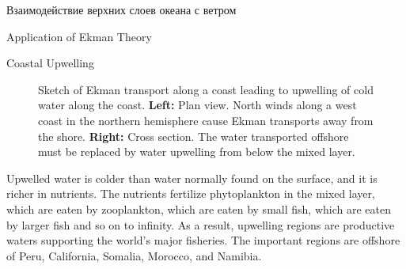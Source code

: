 \begin{chapter}{Взаимодействие верхних слоев океана с ветром}
\begin{section}{Application of Ekman Theory}
\begin{paragraph}{Coastal Upwelling}
\begin{figure}[t!]
\caption{Sketch of Ekman transport along a coast leading to
upwelling of cold water along the
coast. \textbf{Left:} Plan view. North winds along a west coast in the
northern hemisphere cause Ekman transports away from the
shore. \textbf{Right:} Cross section. The water transported offshore
must be replaced by water upwelling from below the mixed
layer.}
\label{fig:upwelling}
\end{figure}
%

Upwelled water is colder than water normally found on the surface, and
it is richer in nutrients. The nutrients fertilize phytoplankton in
the mixed layer, which are eaten
by zooplankton, which are eaten by small fish, which are eaten by
larger fish and so on to infinity. As a result,
upwelling regions are productive waters
supporting the world's major fisheries. The important regions are
offshore of Peru, California, Somalia, Morocco, and Namibia.
%


\end{paragraph}
\end{section}
\end{chapter}
